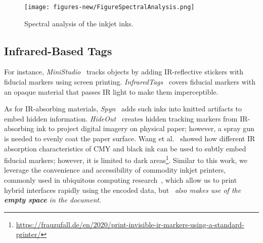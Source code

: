 \begin{figure*}[]
  \centering
  \texttt{[image: figures-new/FigureSpectralAnalysis.png]}
  \caption{Spectral analysis of the inkjet inks.}
  \label{fig:inkSpectrumFigure}
\end{figure*}






\subsection{Infrared-Based Tags}
For instance, 
\textit{MiniStudio}~\cite{kim_ministudio_2016} tracks objects by adding IR-reflective stickers
with fiducial markers
using screen printing.
\textit{InfraredTags}~\cite{dogan_infraredtags_2022} covers fiducial markers with an opaque material that passes IR light to make them imperceptible.

As for IR-absorbing materials, 
\textit{Spyn}~\cite{rosner_spyn_2010} adds such inks into knitted artifacts to embed hidden information.
\textit{HideOut}~\cite{willis_hideout_2013} creates hidden tracking markers from IR-absorbing ink to project digital imagery on physical paper; however, a spray gun is needed to evenly coat the paper surface.
Wang et al.~\cite{wang_design_2008} showed how different IR absorption characteristics of CMY and black ink can be used to subtly embed fiducial markers; however, it is limited to dark areas\footnote{\url{https://frauzufall.de/en/2020/print-invisible-ir-markers-using-a-standard-printer/}}.
Similar to this work, we leverage the convenience and accessibility of commodity inkjet printers, commonly used in ubiquitous computing research~\cite{kawahara_instant_2013,cheng_silver_2020}, which allow us to print hybrid interfaces rapidly using the encoded data, but \systemName~\textit{also makes use of the \textbf{empty space} in the document}.



